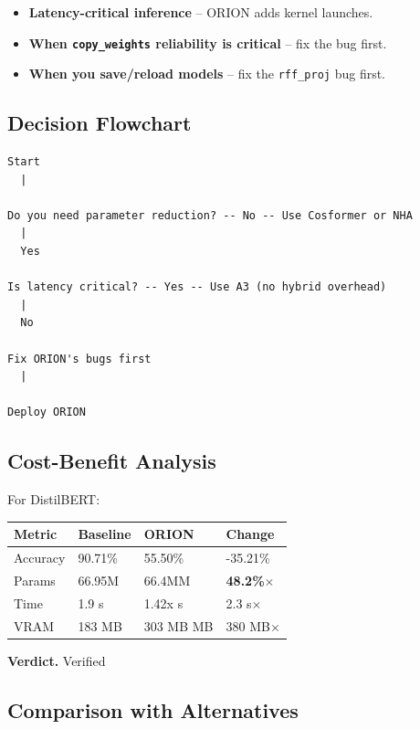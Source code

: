 \begin{itemize}
\item \textbf{Latency-critical inference} -- ORION adds kernel launches.
\item \textbf{When \texttt{copy\_weights} reliability is critical} -- fix the bug first.
\item \textbf{When you save/reload models} -- fix the \texttt{rff\_proj} bug first.

\end{itemize}
\subsection{Decision Flowchart}

\begin{lstlisting}
Start
  |
   
Do you need parameter reduction? -- No -- Use Cosformer or NHA
  |
  Yes
   
Is latency critical? -- Yes -- Use A3 (no hybrid overhead)
  |
  No
   
Fix ORION's bugs first
  |
   
Deploy ORION
\end{lstlisting}

\subsection{Cost-Benefit Analysis}

For DistilBERT:

\begin{table}[H]
\centering
\small
\begin{tabular}{llll}
\toprule
\textbf{Metric} & \textbf{Baseline} & \textbf{ORION} & \textbf{Change} \\
\midrule
Accuracy & 90.71\% & 55.50\% & -35.21\% \\
Params & 66.95M & 66.4MM & \textbf{48.2\%$\times$} \\
Time & 1.9 s & 1.42x s & 2.3 s$\times$ \\
VRAM & 183 MB & 303 MB MB & 380 MB$\times$ \\
\bottomrule
\end{tabular}
\end{table}

\textbf{Verdict.} Verified

\subsection{Comparison with Alternatives}

